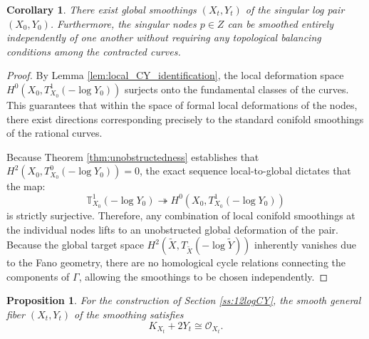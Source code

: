 \documentclass[11pt]{article}
\newtheorem{prop}[thm]{Proposition}
\newtheorem{cor}[thm]{Corollary}
\theoremstyle{definition}
\newcommand{\OO}{\mathcal{O}}
\newcommand{\vT}{\mathbb{T}}           %
\begin{document}
\begin{cor} \label{cor:independent_smoothings}
There exist global smoothings $(X_t, Y_t)$ of the singular log pair $(X_0, Y_0)$. Furthermore, the singular nodes $p \in Z$ can be smoothed entirely independently of one another without requiring any topological balancing conditions among the contracted curves.
\end{cor}
\begin{proof}
By Lemma \ref{lem:local_CY_identification}, the local deformation space $H^0(X_0, T^1_{X_0}(-\log Y_0))$ surjects onto the fundamental classes of the curves. This guarantees that within the space of formal local deformations of the nodes, there exist directions corresponding precisely to the standard conifold smoothings of the rational curves. 

Because Theorem \ref{thm:unobstructedness} establishes that $H^2(X_0, T^0_{X_0}(-\log Y_0)) = 0$, the exact sequence local-to-global dictates that the map:
\[
\vT^1_{X_0}(-\log Y_0) \twoheadrightarrow H^0(X_0, T^1_{X_0}(-\log Y_0))
\]
is strictly surjective. Therefore, any combination of local conifold smoothings at the individual nodes lifts to an unobstructed global deformation of the pair. Because the global target space $H^2(\tilde{X}, T_{\tilde{X}}(-\log \tilde{Y}))$ inherently vanishes due to the Fano geometry, there are no homological cycle relations connecting the components of $\Gamma$, allowing the smoothings to be chosen independently.
\end{proof}

\begin{prop}\label{prop:smoothingHalfPreservation} For the construction of Section \ref{ss:12logCY}, 
the smooth general fiber $(X_t, Y_t)$ of the smoothing satisfies 
\[ K_{X_t} + 2Y_t \cong \OO_{X_t}. \]
\end{prop}
\end{document}
